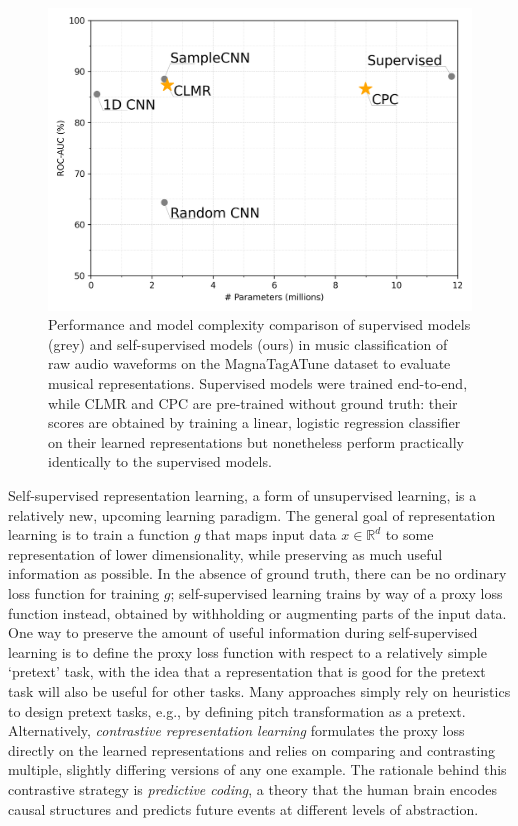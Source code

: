 \documentclass{report}
\begin{document}
\begin{figure}[t]
    \includegraphics[width=\columnwidth]{figs/performance.png}
    \caption{Performance and model complexity comparison of supervised models (grey) and self-supervised models (ours) in music classification of raw audio waveforms on the MagnaTagATune dataset to evaluate musical representations. Supervised models were trained end-to-end, while CLMR and CPC are pre-trained without ground truth: their scores are obtained by training a linear, logistic regression classifier on their learned representations but nonetheless perform practically identically to the supervised models.}
    \label{fig:example}
\end{figure}

Self-supervised representation learning, a form of unsupervised learning, is a relatively new, upcoming learning paradigm\cite{dosovitskiy2015discriminative, oord_representation_2019, hjelm_learning_2019,chen_simple_2020}.
The general goal of representation learning is to train a function $g$ that maps input data $x \in \mathbb{R}^d$ to some representation of lower dimensionality, while preserving as much useful information as possible. In the absence of ground truth, there can be no ordinary loss function for training $g$; self-supervised learning trains by way of a proxy loss function instead, obtained by withholding or augmenting parts of the input data. One way to preserve the amount of useful information during self-supervised learning is to define the proxy loss function with respect to a relatively simple `pretext' task, with the idea that a representation that is good for the pretext task will also be useful for other tasks. Many approaches simply rely on heuristics to design pretext tasks\cite{doersch_unsupervised_2015,zhang2016colorful}, e.g., by defining pitch transformation as a pretext\cite{spice}. Alternatively, \emph{contrastive representation learning} formulates the proxy loss directly on the learned representations and relies on comparing and contrasting multiple, slightly differing versions of any one example. The rationale behind this contrastive strategy is \emph{predictive coding}, a theory that the human brain encodes causal structures and predicts future events at different levels of abstraction\cite{friston_predictive_2009}.
\end{document}
